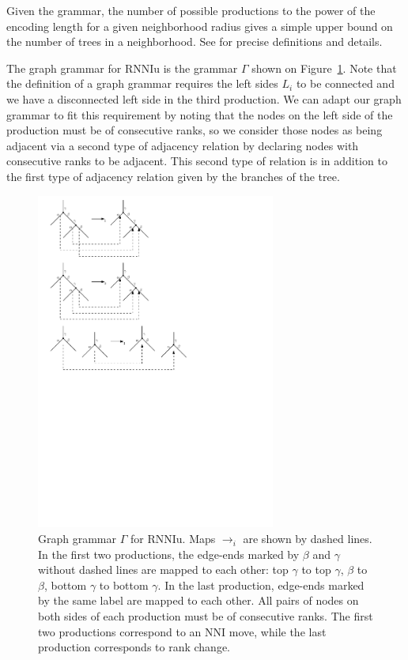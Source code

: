 \documentclass[11pt]{amsart}
\theoremstyle{definition}
\newcommand{\nni}{\mathrm{NNI}}
\newcommand{\rnniu}{\mathrm{RNNIu}}
\begin{document}
Given the grammar, the number of possible productions to the power of the encoding length for a given neighborhood radius gives a simple upper bound on the number of trees in a neighborhood.
See \autocite{Sleator1992-bp} for precise definitions and details.

The graph grammar for $\rnniu$ is the grammar $\Gamma$ shown on Figure~\ref{grammar_rNNIu.pdf}.
Note that the definition of a graph grammar requires the left sides $L_i$ to be connected and we have a disconnected left side in the third production.
We can adapt our graph grammar to fit this requirement by noting that the nodes on the left side of the production must be of consecutive ranks, so we consider those nodes as being adjacent via a second type of adjacency relation by declaring nodes with consecutive ranks to be adjacent.
This second type of relation is in addition to the first type of adjacency relation given by the branches of the tree.

\begin{figure}
\centering
\includegraphics[width=0.7\textwidth]{grammar_rNNIu.pdf}
\caption{Graph grammar $\Gamma$ for $\rnniu$.
Maps $\to_i$ are shown by dashed lines.
In the first two productions, the edge-ends marked by $\beta$ and $\gamma$ without dashed lines are mapped to each other: top $\gamma$ to top $\gamma$, $\beta$ to $\beta$, bottom $\gamma$ to bottom $\gamma$.
In the last production, edge-ends marked by the same label are mapped to each other.
All pairs of nodes on both sides of each production must be of consecutive ranks.
The first two productions correspond to an $\nni$ move, while the last production corresponds to rank change.}
\label{grammar_rNNIu.pdf}
\end{figure}
\end{document}
